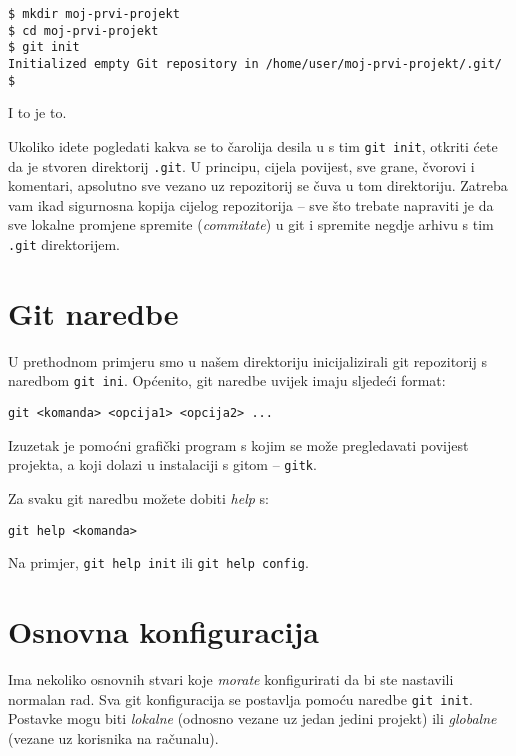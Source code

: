 \begin{verbatim}
$ mkdir moj-prvi-projekt
$ cd moj-prvi-projekt
$ git init
Initialized empty Git repository in /home/user/moj-prvi-projekt/.git/
$ 
\end{verbatim}

I to je to. 

Ukoliko idete pogledati kakva se to čarolija desila u s tim \verb+git init+, otkriti ćete da je stvoren direktorij \verb+.git+.
U principu, cijela povijest, sve grane, čvorovi i komentari, apsolutno sve vezano uz repozitorij se čuva u tom direktoriju.
Zatreba vam ikad sigurnosna kopija cijelog repozitorija -- sve što trebate napraviti je da sve lokalne promjene spremite (\emph{commitate}) u git i spremite negdje arhivu s tim \verb+.git+ direktorijem.

\section*{Git naredbe}

U prethodnom primjeru smo u našem direktoriju inicijalizirali git repozitorij s naredbom \verb+git ini+.
Općenito, git naredbe uvijek imaju sljedeći format:

\begin{verbatim}
git <komanda> <opcija1> <opcija2> ...
\end{verbatim}

Izuzetak je pomoćni grafički program s kojim se može pregledavati povijest projekta, a koji dolazi u instalaciji s gitom -- \verb+gitk+.

Za svaku git naredbu možete dobiti \emph{help} s:

\begin{verbatim}
git help <komanda>
\end{verbatim}

Na primjer, \verb+git help init+ ili \verb+git help config+.

\section*{Osnovna konfiguracija}

Ima nekoliko osnovnih stvari koje \emph{morate} konfigurirati da bi ste nastavili normalan rad. 
Sva git konfiguracija se postavlja pomoću naredbe \verb+git init+. 
Postavke mogu biti \emph{lokalne} (odnosno vezane uz jedan jedini projekt) ili \emph{globalne} (vezane uz korisnika na računalu).

